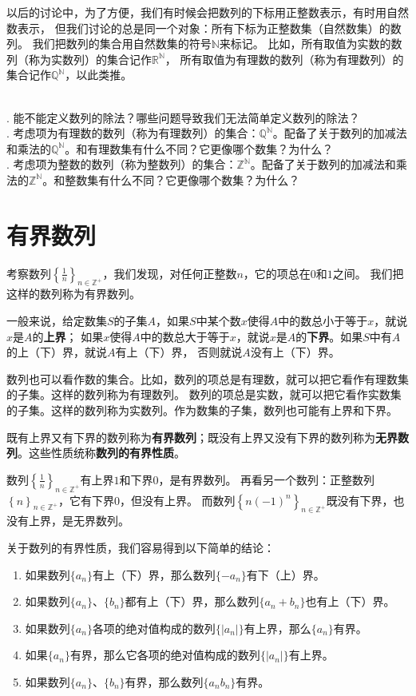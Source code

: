 \documentclass[12pt,UTF8]{ctexbook}
\begin{document}
以后的讨论中，为了方便，我们有时候会把数列的下标用正整数表示，有时用自然数表示，
但我们讨论的总是同一个对象：所有下标为正整数集（自然数集）的数列。
我们把数列的集合用自然数集的符号$\mathbb{N}$来标记。
比如，所有取值为实数的数列（称为实数列）的集合记作$\mathbb{R}^\mathbb{N}$，
所有取值为有理数的数列（称为有理数列）的集合记作$\mathbb{Q}^\mathbb{N}$，以此类推。

\begin{sk}
    \mbox{} \\
    . 能不能定义数列的除法？哪些问题导致我们无法简单定义数列的除法？\\
    . 考虑项为有理数的数列（称为有理数列）的集合：$\mathbb{Q}^{\mathbb{N}}$。配备了关于数列的加减法和乘法的$\mathbb{Q}^{\mathbb{N}}$。和有理数集有什么不同？它更像哪个数集？为什么？\\
    . 考虑项为整数的数列（称为整数列）的集合：$\mathbb{Z}^{\mathbb{N}}$。配备了关于数列的加减法和乘法的$\mathbb{Z}^{\mathbb{N}}$。和整数集有什么不同？它更像哪个数集？为什么？
\end{sk}

\section{有界数列}
考察数列$\left\{\frac{1}{n}\right\}_{n\in\mathbb{Z}^+}$，我们发现，对任何正整数$n$，它的项总在$0$和$1$之间。
我们把这样的数列称为有界数列。

一般来说，给定数集$S$的子集$A$，如果$S$中某个数$x$使得$A$中的数总小于等于$x$，就说$x$是$A$的\textbf{上界}；
如果$x$使得$A$中的数总大于等于$x$，就说$x$是$A$的\textbf{下界}。如果$S$中有$A$的上（下）界，就说$A$有上（下）界，
否则就说$A$没有上（下）界。

数列也可以看作数的集合。比如，数列的项总是有理数，就可以把它看作有理数集的子集。这样的数列称为有理数列。
数列的项总是实数，就可以把它看作实数集的子集。这样的数列称为实数列。作为数集的子集，数列也可能有上界和下界。

既有上界又有下界的数列称为\textbf{有界数列}；既没有上界又没有下界的数列称为\textbf{无界数列}。这些性质统称\textbf{数列的有界性质}。

数列$\left\{\frac{1}{n}\right\}_{n\in\mathbb{Z}^+}$有上界$1$和下界$0$，是有界数列。
再看另一个数列：正整数列$\left\{n\right\}_{n\in\mathbb{Z}^+}$，它有下界$0$，但没有上界。
而数列$\left\{n(-1)^n\right\}_{n\in\mathbb{Z}^+}$既没有下界，也没有上界，是无界数列。

关于数列的有界性质，我们容易得到以下简单的结论：
\begin{enumerate}
    \item 如果数列$\{a_n\}$有上（下）界，那么数列$\{-a_n\}$有下（上）界。
    \item 如果数列$\{a_n\}$、$\{b_n\}$都有上（下）界，那么数列$\{a_n + b_n\}$也有上（下）界。
    \item 如果数列$\{a_n\}$各项的绝对值构成的数列$\{|a_n|\}$有上界，那么$\{a_n\}$有界。
    \item 如果$\{a_n\}$有界，那么它各项的绝对值构成的数列$\{|a_n|\}$有上界。
    \item 如果数列$\{a_n\}$、$\{b_n\}$有界，那么数列$\{a_n b_n\}$有界。
\end{enumerate}
\end{document}
